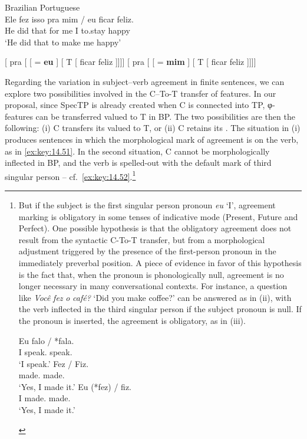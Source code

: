 \documentclass[output=paper]{langsci/langscibook}
\begin{document}
\ea%
    \label{ex:key:14.49}Brazilian Portuguese\\
    \gll    Ele fez isso pra mim / eu ficar feliz.\\
            He did that for me {} I to.stay happy\\
    \glt    ‘He did that to make me happy’
\z

\ea%
    \label{ex:key:14.50}
	\ea
    {}[ pra [ [ \Fsg{} = \textbf{eu} ]
        [ T [ ficar feliz ]]]]
    \ex
    {}[ pra [ [ \Fsg{} = \textbf{mim} ]
        [ T [ ficar feliz ]]]]
    \z
\z

Regarding the variation in subject--verb agreement in finite sentences, we can explore two possibilities involved in
the C--To-T transfer of features. In our proposal, since SpecTP is already
created when C is connected into TP, φ-features can be transferred valued to T
in BP. The two possibilities are then the following: (i) C transfers its valued
 to T, or (ii) C retains its . The situation in
(i) produces sentences in which the morphological mark of agreement is on the
verb, as in \eqref{ex:key:14.51}.  In the second situation, C cannot be
morphologically inflected in BP, and the verb is spelled-out with the default
mark of third singular person -- cf.\ \eqref{ex:key:14.52}.\footnote{But if the
    subject is the first singular person pronoun \emph{eu} ‘I’, agreement
    marking is obligatory in some tenses of indicative mode (Present, Future
    and Perfect). One possible hypothesis is that the obligatory agreement does
    not result from the syntactic C-To-T transfer, but from a morphological
    adjustment triggered by the presence of the first-person pronoun in the
    immediately preverbal position. A piece of evidence in favor of this
    hypothesis is the fact that, when the pronoun is phonologically null,
    agreement is no longer necessary in many conversational contexts.  For
    instance, a question like \emph{Você} \emph{fez} \emph{o} \emph{café?} ‘Did
    you make coffee?’ can be answered as in (ii), with the verb inflected in
    the third singular person if the subject pronoun is null. If the pronoun is
    inserted, the agreement is obligatory, as in (iii).

    \begin{exe}
        \gll    Eu falo / *fala.\\
                I speak.\Fsg{} {} \hphantom{*}speak.\Tsg{}\\
        \glt    ‘I speak.’
        \gll    Fez / Fiz.\\
                made.\Tsg{} {} made.\Fsg{}\\
        \glt    ‘Yes, I made it.’
        \gll    Eu (*fez) / fiz.\\
                I \hphantom{(*}made.\Tsg{} {} made.\Fsg{}\\
        \glt    ‘Yes, I made it.’
    \end{exe}}
\end{document}
